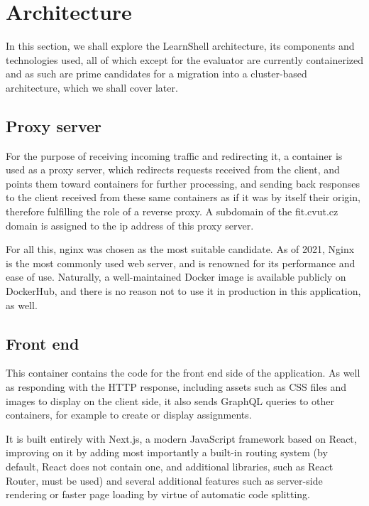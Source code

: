 \documentclass[thesis=B,english]{FITthesis}[2019/12/23]
\begin{document}
\section{Architecture}

In this section, we shall explore the LearnShell architecture, its components and technologies used, all of which except for the evaluator are currently containerized and as such are prime candidates for a migration into a cluster-based architecture, which we shall cover later.

\subsection{Proxy server}

For the purpose of receiving incoming traffic and redirecting it, a container is used as a proxy server, which redirects requests received from the client, and points them toward containers for further processing, and sending back responses to the client received from these same containers as if it was by itself their origin, therefore fulfilling the role of a reverse proxy. \cite{proxies} A subdomain of the fit.cvut.cz domain is assigned to the ip address of this proxy server.

For all this, nginx was chosen as the most suitable candidate. As of 2021, Nginx is the most commonly used web server, and is renowned for its performance and ease of use. \cite{netcraft} Naturally, a well-maintained Docker image is available publicly on DockerHub, and there is no reason not to use it in production in this application, as well.

\subsection{Front end}

This container contains the code for the front end side of the application. As well as responding with the HTTP response, including assets such as CSS files and images to display on the client side, it also sends GraphQL queries to other containers, for example to create or display assignments. 

It is built entirely with Next.js, a modern JavaScript framework based on React, improving on it by adding most importantly a built-in routing system (by default, React does not contain one, and additional libraries, such as React Router, must be used) and several additional features such as server-side rendering or faster page loading by virtue of automatic code splitting.
\end{document}
